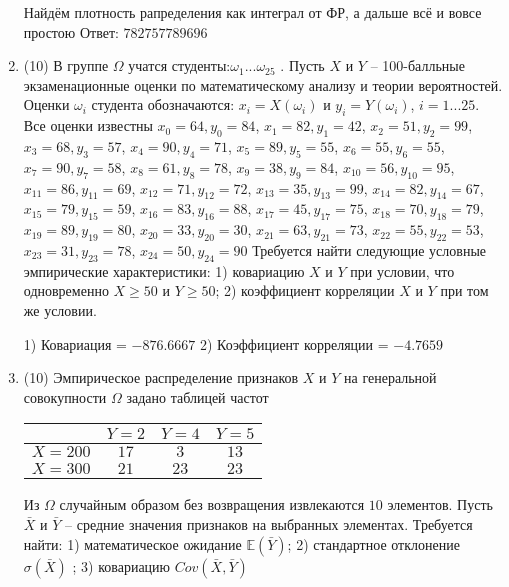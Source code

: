 \documentclass[a4paper,12pt]{article}
\begin{document}
\begin{enumerate}
Найдём плотность рапределения как интеграл от ФР, а дальше всё и вовсе простою Ответ: $782757789696$


\item


(10) В группе $\Omega$ учатся студенты:$\omega _{1}...\omega _{25}$ . Пусть $X$ и $Y$ – 100-балльные экзаменационные оценки по
математическому анализу и теории вероятностей. Оценки $\omega _{i}$ студента обозначаются: $x _{i} = X(\omega _{i})$ и $y _{i} = Y(\omega _{i})$, $i = 1...25$. Все оценки известны
$x _{0} = 64, y _{0} = 84$, $x _{1} = 82, y _{1} = 42$, $x _{2} = 51, y _{2} = 99$, $x _{3} = 68, y _{3} = 57$, $x _{4} = 90, y _{4} = 71$, $x _{5} = 89, y _{5} = 55$, $x _{6} = 55, y _{6} = 55$, $x _{7} = 90, y _{7} = 58$, $x _{8} = 61, y _{8} = 78$, $x _{9} = 38, y _{9} = 84$, $x _{10} = 56, y _{10} = 95$, $x _{11} = 86, y _{11} = 69$, $x _{12} = 71, y _{12} = 72$, $x _{13} = 35, y _{13} = 99$, $x _{14} = 82, y _{14} = 67$, $x _{15} = 79, y _{15} = 59$, $x _{16} = 83, y _{16} = 88$, $x _{17} = 45, y _{17} = 75$, $x _{18} = 70, y _{18} = 79$, $x _{19} = 89, y _{19} = 80$, $x _{20} = 33, y _{20} = 30$, $x _{21} = 63, y _{21} = 73$, $x _{22} = 55, y _{22} = 53$, $x _{23} = 31, y _{23} = 78$, $x _{24} = 50, y _{24} = 90$
Требуется
найти следующие условные эмпирические характеристики: 1) ковариацию $X$ и $Y$ при условии, что одновременно $X \geqslant 50$
 и $Y \geqslant 50$; 2) коэффициент корреляции $X$ и $Y$ при том же условии.




1) Ковариация = $-876.6667$
2) Коэффициент корреляции = $-4.7659$


\item


(10) Эмпирическое распределение признаков $X$ и $Y$ на генеральной совокупности $\Omega$ задано таблицей частот  
 
\begin{tabular}{ | c | c | c | c | }
\hline
 & $Y = 2$ & $Y = 4$ & $Y = 5$  \\ \hline
$X = 200$ & $17$ & $3$ & $13$\\ \hline
$X = 300$ & $21$ & $23$ & $23$\\
\hline
\end{tabular}

Из $\Omega$ случайным образом без возвращения извлекаются $10$ элементов. 
Пусть $\bar X$ и $\bar Y$ – средние значения признаков на выбранных элементах. 
Требуется найти: 1) математическое ожидание $\mathbb{E}(\bar Y)$; 2) стандартное отклонение $\sigma(\bar X)$ ; 
3) ковариацию $Cov(\bar X, \bar Y)$





\end{enumerate}
\end{document}
